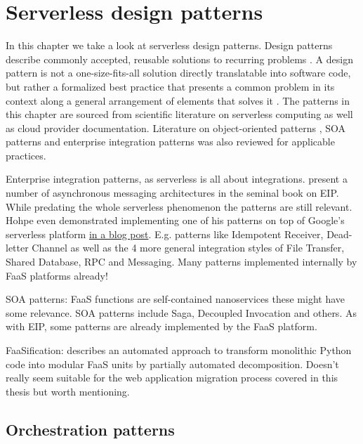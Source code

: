 \chapter{Serverless design patterns} \label{cha:patterns}

In this chapter we take a look at serverless design patterns. Design patterns describe commonly accepted, reusable solutions to recurring problems \parencite{hohpe2004enterprise}. A design pattern is not a one-size-fits-all solution directly translatable into software code, but rather a formalized best practice that presents a common problem in its context along a general arrangement of elements that solves it \parencite{gamma94designPatterns}. The patterns in this chapter are sourced from scientific literature on serverless computing as well as cloud provider documentation. Literature on object-oriented patterns \parencite{gamma94designPatterns}, SOA patterns \parencite{rotem12soa} and enterprise integration patterns \parencite{hohpe2004enterprise} was also reviewed for applicable practices.

Enterprise integration patterns, as serverless is all about integrations. \textcite{hohpe2004enterprise} present a number of asynchronous messaging architectures in the seminal book on EIP. While predating the whole serverless phenomenon the patterns are still relevant. Hohpe even demonstrated implementing one of his patterns on top of Google's serverless platform \href{http://www.enterpriseintegrationpatterns.com/ramblings/google_cloud_functions.html}{in a blog post}. E.g. patterns like Idempotent Receiver, Dead-letter Channel as well as the 4 more general integration styles of File Transfer, Shared Database, RPC and Messaging. Many patterns implemented internally by FaaS platforms already!

SOA patterns: FaaS functions are self-contained nanoservices these might have some relevance. SOA patterns \parencite{rotem12soa} include Saga, Decoupled Invocation and others. As with EIP, some patterns are already implemented by the FaaS platform.

FaaSification: \textcite{spillner17transformpython} describes an automated approach to transform monolithic Python code into modular FaaS units by partially automated decomposition. Doesn't really seem suitable for the web application migration process covered in this thesis but worth mentioning.

\section{Orchestration patterns} \label{sec:orchestrationPatterns}

